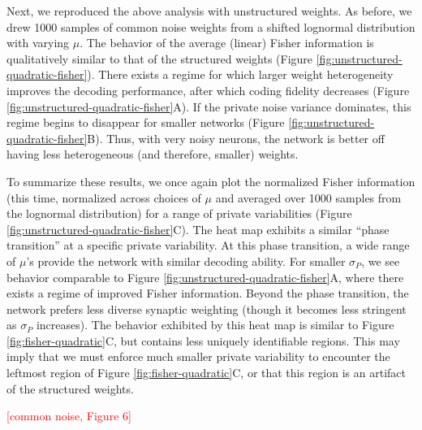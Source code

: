 \documentclass[12pt]{article}
\begin{document}
Next, we reproduced the above analysis with unstructured weights. As before, we drew 1000 samples of common noise weights from a shifted lognormal distribution with varying $\mu$. The behavior of the average (linear) Fisher information is qualitatively similar to that of the structured weights (Figure \ref{fig:unstructured-quadratic-fisher}). There exists a regime for which larger weight heterogeneity improves the decoding performance, after which coding fidelity decreases (Figure \ref{fig:unstructured-quadratic-fisher}A). If the private noise variance dominates, this regime begins to disappear for smaller networks (Figure \ref{fig:unstructured-quadratic-fisher}B). Thus, with very noisy neurons, the network is better off having less heterogeneous (and therefore, smaller) weights.
	
To summarize these results, we once again plot the normalized Fisher information (this time, normalized across choices of $\mu$ and averaged over 1000 samples from the lognormal distribution) for a range of private variabilities (Figure \ref{fig:unstructured-quadratic-fisher}C).  The heat map exhibits a similar ``phase transition'' at a specific private variability. At this phase transition, a wide range of $\mu$'s provide the network with similar decoding ability. For smaller $\sigma_P$, we see behavior comparable to Figure \ref{fig:unstructured-quadratic-fisher}A, where there exists a regime of improved Fisher information. Beyond the phase transition, the network prefers less diverse synaptic weighting (though it becomes less stringent as $\sigma_P$ increases). The behavior exhibited by this heat map is similar to Figure \ref{fig:fisher-quadratic}C, but contains less uniquely identifiable regions. This may imply that we must enforce much smaller private variability to encounter the leftmost region of Figure \ref{fig:fisher-quadratic}C, or that this region is an artifact of the structured weights.

\textcolor{red}{[common noise, Figure 6]}
\end{document}
